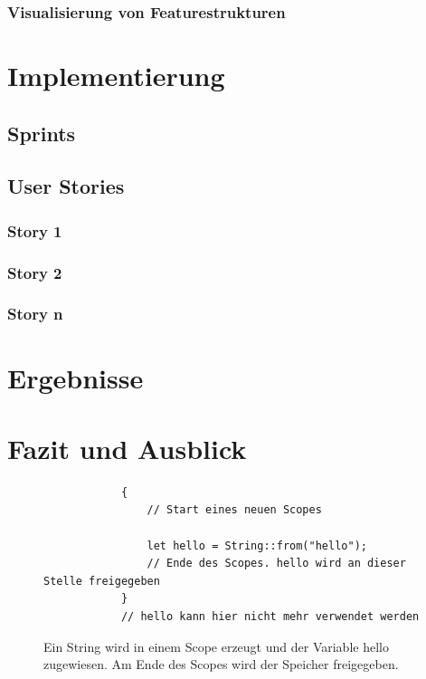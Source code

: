 \documentclass[a4paper, fontsize=11pt, parskip=half, twoside]{scrreprt}
\begin{document}
	\subsection{Visualisierung von Featurestrukturen}
	
	
	
	\chapter{Implementierung}
	
	
	\section{Sprints}
	
	\section{User Stories}
	
	\subsection{Story 1}
	
	\subsection{Story 2}
	
	\subsection{Story n}
	
	
	
	\chapter{Ergebnisse}
	
	
	
	\chapter{Fazit und Ausblick}
	
	
	
	\begin{figure}[ht]
		\begin{verbatim}
			{
				// Start eines neuen Scopes
				
				let hello = String::from("hello");
				// Ende des Scopes. hello wird an dieser Stelle freigegeben
			}
			// hello kann hier nicht mehr verwendet werden
		\end{verbatim}
		\caption{Ein String wird in einem Scope erzeugt und der Variable hello zugewiesen. Am Ende des Scopes wird der Speicher freigegeben.}
		\label{fig:drop:example}
	\end{figure}
	
\end{document}
